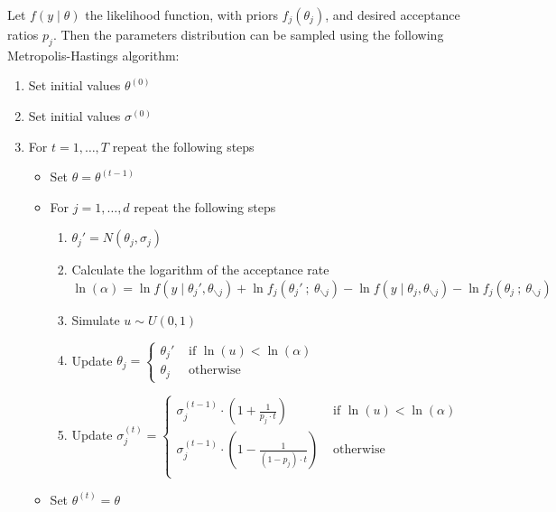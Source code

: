 \documentclass[11pt,fleqn]{book} %
\begin{document}
\begin{algorithm} 
	\label{alg:bimh}
	Let $f(y \mid \theta)$ the likelihood function, with priors $f_j(\theta_j)$,
	and desired acceptance ratios $p_j$. Then the parameters distribution
	can be sampled using the following Metropolis-Hastings algorithm:
	\begin{enumerate}
		\item Set initial values $\theta^{(0)}$
		\item Set initial values $\sigma^{(0)}$
		\item For $t=1,\dots,T$ repeat the following steps
		\begin{itemize}
			\item Set $\theta=\theta^{(t-1)}$
			\item For $j=1,\dots,d$ repeat the following steps
			\begin{enumerate}[label=\alph*.]
				\item $\theta_j' = N(\theta_j,\sigma_j)$
				\item Calculate the logarithm of the acceptance rate \\
				$\ln(\alpha) = 
					\ln f(y \mid \theta_j',\theta_{\backslash j}) + 
					\ln f_j(\theta_j'\ ;\ \theta_{\backslash j}) - 
					\ln f(y \mid \theta_j,\theta_{\backslash j}) - 
					\ln f_j(\theta_j\ ; \ \theta_{\backslash j})
				$
				\item Simulate $u \sim U(0,1)$
				\item Update $\theta_j=\left\{
				\begin{array}{ll}
					\theta_j' & \text{ if } \ln(u) < \ln(\alpha) \\
					\theta_j  & \text{ otherwise }               
				\end{array}\right.$ 
				\item Update $\sigma_j^{(t)} = \left\{
					\begin{array}{ll}
						\sigma_j^{(t-1)} \cdot \left( 1 + \frac{1}{p_j \cdot t} \right) & \text{ if } \ln(u) < \ln(\alpha) \\
						\sigma_j^{(t-1)} \cdot \left( 1 - \frac{1}{(1-p_j) \cdot t} \right) & \text{ otherwise } \\
					\end{array}
				\right.$
			\end{enumerate}
			\item Set $\theta^{(t)}=\theta$
		\end{itemize}
	\end{enumerate}
\end{algorithm}
\end{document}
